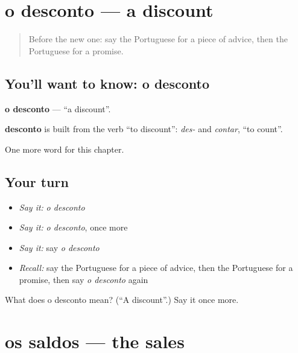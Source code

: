 \section[o desconto]{o desconto — a discount}

\label{lesson:PT-C222-desconto}



\begin{quote}
Before the new one: say the Portuguese for a piece of advice, then the Portuguese for a promise.
\end{quote}

\subsection*{You'll want to know: o desconto}
\textbf{o desconto} — \textquotedblleft{}a discount\textquotedblright{}.

\begin{cousinweb}
\textbf{desconto} is built from the verb \textquotedblleft{}to discount\textquotedblright{}: \emph{des-} and \emph{contar}, \textquotedblleft{}to count\textquotedblright{}.
\end{cousinweb}

\begin{grammarlens}[title={What you've built}]
One more word for this chapter.
\end{grammarlens}

\subsection*{Your turn}
\begin{itemize}
\raggedright
  \item \emph{Say it:} \emph{o desconto}
  \item \emph{Say it:} \emph{o desconto}, once more
  \item \emph{Say it:} say \emph{o desconto}
  \item \emph{Recall:} say the Portuguese for a piece of advice, then the Portuguese for a promise, then say \emph{o desconto} again
\end{itemize}

\begin{tcolorbox}[breakable,colback=teal!4,colframe=teal!35!black,title={Before you move on}]
What does o desconto mean? (\textquotedblleft{}A discount\textquotedblright{}.) Say it once more.
\end{tcolorbox}
\section[os saldos]{os saldos — the sales}

